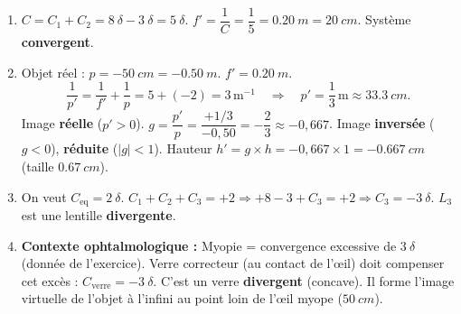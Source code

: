\documentclass[11pt]{article}
\begin{document}
\begin{corrige}
\begin{enumerate}
    \item $C = C_1 + C_2 = \SI{+8}{\delta} - \SI{3}{\delta} = \SI{+5}{\delta}$.
    $f' = \dfrac{1}{C} = \dfrac{1}{5} = \SI{0,20}{m} = \SI{20}{cm}$.
    Système \textbf{convergent}.
    \item Objet réel : $p = \SI{-50}{cm} = \SI{-0,50}{m}$. $f' = \SI{+0,20}{m}$.
    \[ \frac{1}{p'} = \frac{1}{f'} + \frac{1}{p} = 5 + (-2) = 3\,\text{m}^{-1} \quad\Rightarrow\quad p' = \frac{1}{3}\,\text{m} \approx \SI{+33,3}{cm}. \]
    Image \textbf{réelle} ($p'>0$).
    $g = \dfrac{p'}{p} = \dfrac{+1/3}{-0,50} = -\dfrac{2}{3} \approx -0,667$.
    Image \textbf{inversée} ($g<0$), \textbf{réduite} ($|g|<1$).
    Hauteur $h' = g \times h = -0,667 \times 1 = \SI{-0,667}{cm}$ (taille $\SI{0,67}{cm}$).
    \item On veut $C_{\text{eq}} = \SI{+2}{\delta}$. $C_1 + C_2 + C_3 = +2 \Rightarrow +8 - 3 + C_3 = +2 \Rightarrow C_3 = \SI{-3}{\delta}$.
    $L_3$ est une lentille \textbf{divergente}.
    \item \textbf{Contexte ophtalmologique :} Myopie = convergence excessive de $\SI{3}{\delta}$ (donnée de l'exercice).
    Verre correcteur (au contact de l'œil) doit compenser cet excès : $C_{\text{verre}} = \SI{-3}{\delta}$.
    C'est un verre \textbf{divergent} (concave). Il forme l'image virtuelle de l'objet à l'infini au point loin de l'œil myope ($\SI{50}{cm}$).
\end{enumerate}
\end{corrige}
\end{document}
